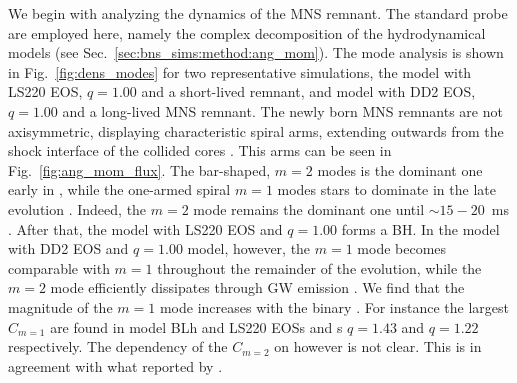 We begin with analyzing the \pmerg{} dynamics of the \ac{MNS} remnant. The standard 
probe are employed here, namely the complex decomposition of the hydrodynamical models
(see Sec.~\ref{sec:bns_sims:method:ang_mom}). 
%
The mode analysis is shown in Fig.~\ref{fig:dens_modes} for two representative 
simulations, the model with LS220 \ac{EOS}, $q=1.00$ and a short-lived remnant, 
and model with DD2 \ac{EOS}, $q=1.00$ and a long-lived \ac{MNS} remnant.
%
The newly born \ac{MNS} remnants are not axisymmetric, displaying characteristic 
spiral arms, extending outwards from the shock interface of the collided cores 
\citep{Shibata:1999wm,Shibata:2006nm,Bernuzzi:2013rza,Kastaun:2014fna,East:2015vix,Paschalidis:2015mla,Radice:2016gym,Lehner:2016wjg}.
%
This arms can be seen in Fig.~\ref{fig:ang_mom_flux}. 
%
The bar-shaped, $m=2$ modes is the dominant one early in \pmerg{}, while the 
one-armed spiral $m=1$ modes stars to dominate in the late evolution 
\citep{East:2015vix,Paschalidis:2015mla,Radice:2016gym,Lehner:2016wjg,Bernuzzi:2013rza,Kastaun:2014fna}.
%
Indeed, the $m=2$ mode remains the dominant one until $\sim15-20$~ms \pmerg{}. 
After that, the model with LS220 \ac{EOS} and $q=1.00$ forms a \ac{BH}. 
In the model with DD2 \ac{EOS} and $q=1.00$ model, however, the $m=1$ mode 
becomes comparable with $m=1$ throughout the remainder of the evolution, while 
the $m=2$ mode efficiently dissipates through \ac{GW} emission 
\citep{Bernuzzi:2015opx,Radice:2016gym}.
%
We find that the magnitude of the $m=1$ mode increases with the binary \mr{}.
For instance the largest $C_{m=1}$ are found in model BLh and LS220 \acp{EOS}
and \mr{}s $q=1.43$ and $q=1.22$ respectively. 
The dependency of the $C_{m=2}$ on \mr{} however is not clear. 
This is in agreement with what reported by \citet{Lehner:2016wjg}.

